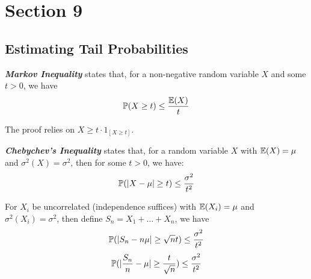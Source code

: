 \section{Section 9}
\subsection{Estimating Tail Probabilities}
\begin{theorem}
    \textbf{\textit{Markov Inequality}} states that, for a non-negative random variable $X$ and some $t > 0$, we have
    $$\mathbb{P}(X \ge t) \le \frac{\mathbb{E}(X)}{t}$$
\end{theorem}
The proof relies on $X \ge t \cdot 1_{[X \ge t]}$.
\begin{theorem}
    \textbf{\textit{Chebychev's Inequality}} states that, for a random variable $X$ with $\mathbb{E}(X) = \mu$ and $\sigma^2(X) = \sigma^2$, then for some $t > 0$, we have:
    $$\mathbb{P}(|X - \mu| \ge t) \le \frac{\sigma^2}{t^2}$$
\end{theorem}
For $X_i$ be uncorrelated (independence suffices) with $\mathbb{E}(X_i) = \mu$ and $\sigma^2(X_i) = \sigma^2$, then define $S_n = X_1 + \dots + X_n$, we have
$$\mathbb{P}(|S_n - n\mu| \ge \sqrt{n}t) \le \frac{\sigma^2}{t^2}$$
$$\mathbb{P}(|\frac{S_n}{n} - \mu| \ge \frac{t}{\sqrt{n}}) \le \frac{\sigma^2}{t^2}$$

\subsection{}
